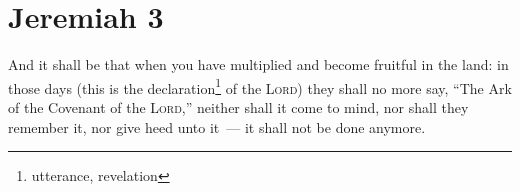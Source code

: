 \section{Jeremiah 3}\label{Jeremiah 3}
\begin{enumerate}
     And it shall be that when you have multiplied and become fruitful in the land: in those days (this is the declaration\footnote{utterance, revelation} of the \textsc{Lord}) they shall no more say, ``The Ark of the Covenant of the \textsc{Lord},'' neither shall it come to mind, nor shall they remember it, nor give heed unto it~--- it shall not be done anymore.%
\end{enumerate}
